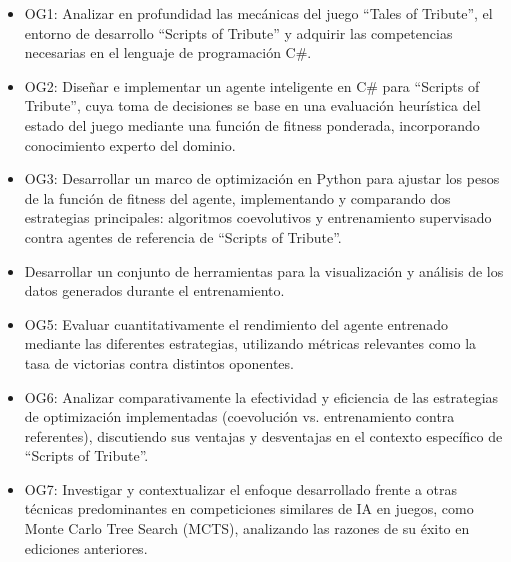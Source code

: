 \begin{itemize}
	\item OG1: Analizar en profundidad las mecánicas del juego ``Tales of Tribute'', el entorno de desarrollo ``Scripts of Tribute'' y adquirir las competencias necesarias en el lenguaje de programación C\#.
	\item OG2: Diseñar e implementar un agente inteligente en C\# para ``Scripts of Tribute'', cuya toma de decisiones se base en una evaluación heurística del estado del juego mediante una función de fitness ponderada, incorporando conocimiento experto del dominio.
	\item OG3: Desarrollar un marco de optimización en Python para ajustar los pesos de la función de fitness del agente, implementando y comparando dos estrategias principales: algoritmos coevolutivos y entrenamiento supervisado contra agentes de referencia de ``Scripts of Tribute''.
	\item Desarrollar un conjunto de herramientas para la visualización y análisis de los datos generados durante el entrenamiento.
	\item OG5: Evaluar cuantitativamente el rendimiento del agente entrenado mediante las diferentes estrategias, utilizando métricas relevantes como la tasa de victorias contra distintos oponentes.
	\item OG6: Analizar comparativamente la efectividad y eficiencia de las estrategias de optimización implementadas (coevolución vs. entrenamiento contra referentes), discutiendo sus ventajas y desventajas en el contexto específico de ``Scripts of Tribute''.
	\item OG7: Investigar y contextualizar el enfoque desarrollado frente a otras técnicas predominantes en competiciones similares de IA en juegos, como Monte Carlo Tree Search (MCTS), analizando las razones de su éxito en ediciones anteriores.
\end{itemize}